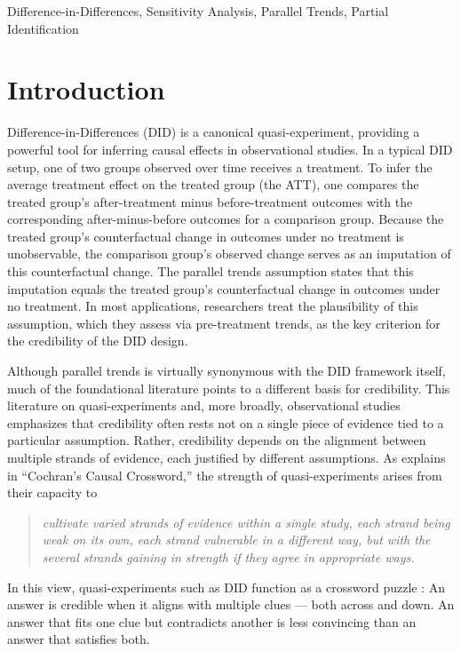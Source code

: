 \documentclass[twoside,11pt]{article}
\begin{document}
\begin{keywords}
Difference-in-Differences, Sensitivity Analysis, Parallel Trends, Partial Identification 
\end{keywords}

\section{Introduction}

Difference-in-Differences (DID) is a canonical quasi-experiment, providing a powerful tool for inferring causal effects in observational studies. In a typical DID setup, one of two groups observed over time receives a treatment. To infer the average treatment effect on the treated group (the \textrm{ATT}), one compares the treated group's after-treatment minus before-treatment outcomes with the corresponding after-minus-before outcomes for a comparison group. Because the treated group's counterfactual change in outcomes under no treatment is unobservable, the comparison group's observed change serves as an imputation of this counterfactual change. The parallel trends assumption states that this imputation equals the treated group's counterfactual change in outcomes under no treatment. In most applications, researchers treat the plausibility of this assumption, which they assess via pre-treatment trends, as the key criterion for the credibility of the DID design.

Although parallel trends is virtually synonymous with the DID framework itself, much of the foundational literature points to a different basis for credibility. This literature on quasi-experiments \citep{shadishetal2002, cookcampbell1979} and, more broadly, observational studies \citep{cochran1965, cochran1972, rosenbaum2001} emphasizes that credibility often rests not on a single piece of evidence tied to a particular assumption. Rather, credibility depends on the alignment between multiple strands of evidence, each justified by different assumptions. As \citet[][p.~209]{rosenbaum2015} explains in ``Cochran's Causal Crossword,'' the strength of quasi-experiments arises from their capacity to
\begin{quote}
\textit{cultivate varied strands of evidence within a single study, each strand being weak on its own, each strand vulnerable in a different way, but with the several strands gaining in strength if they agree in appropriate ways.}
\end{quote}
In this view, quasi-experiments such as DID function as a crossword puzzle \citep{haack1995,haack1993}: An answer is credible when it aligns with multiple clues --- both across and down. An answer that fits one clue but contradicts another is less convincing than an answer that satisfies both.
\end{document}
